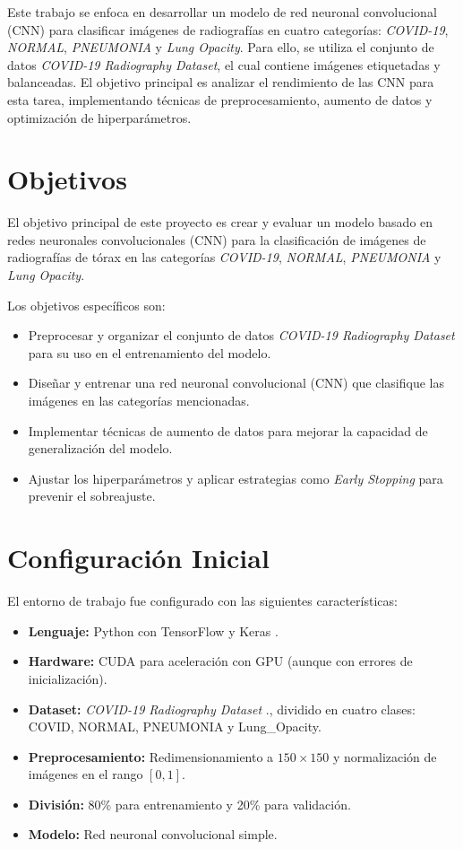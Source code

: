 \documentclass{article}
\begin{document}
	Este trabajo se enfoca en desarrollar un modelo de red neuronal convolucional (CNN) para clasificar imágenes de radiografías en cuatro categorías: \textit{COVID-19}, \textit{NORMAL}, \textit{PNEUMONIA} y \textit{Lung Opacity}. Para ello, se utiliza el conjunto de datos \textit{COVID-19 Radiography Dataset}, el cual contiene imágenes etiquetadas y balanceadas. El objetivo principal es analizar el rendimiento de las CNN para esta tarea, implementando técnicas de preprocesamiento, aumento de datos y optimización de hiperparámetros.
	
	\section{Objetivos}
	
	El objetivo principal de este proyecto es crear y evaluar un modelo basado en redes neuronales convolucionales (CNN) para la clasificación de imágenes de radiografías de tórax en las categorías \textit{COVID-19}, \textit{NORMAL}, \textit{PNEUMONIA} y \textit{Lung Opacity}.
	
	Los objetivos específicos son:
	\begin{itemize}
		\item Preprocesar y organizar el conjunto de datos \textit{COVID-19 Radiography Dataset} para su uso en el entrenamiento del modelo.
		\item Diseñar y entrenar una red neuronal convolucional (CNN) que clasifique las imágenes en las categorías mencionadas.
		\item Implementar técnicas de aumento de datos para mejorar la capacidad de generalización del modelo.
		\item Ajustar los hiperparámetros y aplicar estrategias como \textit{Early Stopping} para prevenir el sobreajuste.
	\end{itemize}
	
	\section{Configuración Inicial}
	
	El entorno de trabajo fue configurado con las siguientes características:
	
	\begin{itemize}
		\item \textbf{Lenguaje:} Python con TensorFlow \cite{tensorflow2015-whitepaper} y Keras \cite{chollet2015keras}.
		\item \textbf{Hardware:} CUDA para aceleración con GPU (aunque con errores de inicialización).
		\item \textbf{Dataset:} \textit{COVID-19 Radiography Dataset} \cite{rahman2020covid19}., dividido en cuatro clases: COVID, NORMAL, PNEUMONIA y Lung\_Opacity.
		\item \textbf{Preprocesamiento:} Redimensionamiento a $150\times150$ y normalización de imágenes en el rango $[0,1]$.
		\item \textbf{División:} 80\% para entrenamiento y 20\% para validación.
		\item \textbf{Modelo:} Red neuronal convolucional simple.
		
	\end{itemize}
	\newpage
	
\end{document}
